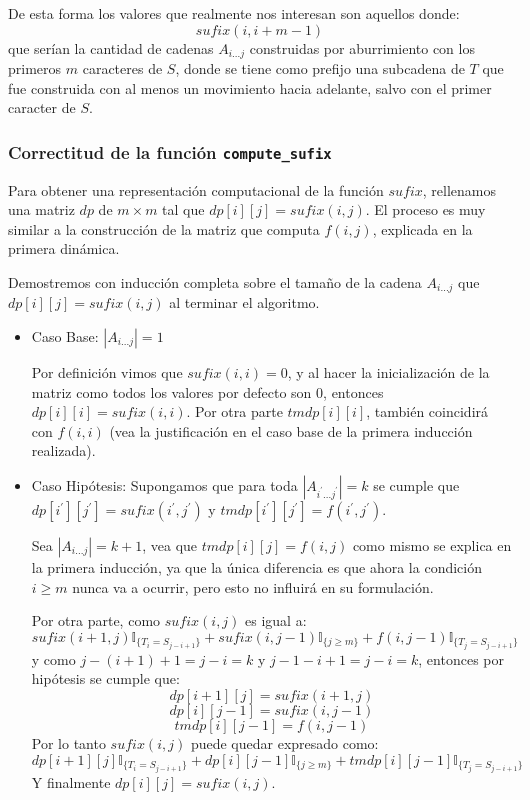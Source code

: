 \documentclass[a4paper]{article}
\begin{document}
    De esta forma los valores que realmente nos interesan son aquellos donde:
    $$sufix(i, i+m-1)$$
    que serían la cantidad de cadenas $A_{i...j}$ construidas por aburrimiento con los primeros $m$ caracteres de $S$, donde se tiene como prefijo una subcadena de $T$ que fue construida con al menos un movimiento hacia adelante, salvo con el primer caracter de $S$.
    

    \subsubsection*{Correctitud de la funci\'on \texttt{compute\_sufix}}

    Para obtener una representaci\'on computacional de la funci\'on $sufix$,
    rellenamos una matriz $dp$ de $m \times m$ tal que $dp[i][j] = sufix(i,j)$. El proceso es muy similar a la construcción de la matriz que computa $f(i,j)$, explicada en la primera dinámica.
    
    Demostremos con inducción completa sobre el tamaño de la cadena $A_{i...j}$ que $dp[i][j]=sufix(i,j)$ al terminar el algoritmo.
    
    \begin{itemize}
    	\item Caso Base: $|A_{i...j}| = 1$
    	
    	Por definición vimos que $sufix(i,i) = 0$, y al hacer la inicialización de la matriz como todos los valores por defecto son $0$, entonces $dp[i][i] = sufix(i,i)$.
    	Por otra parte $tmdp[i][i]$, también coincidirá con $f(i,i)$ (vea la justificación en el caso base de la primera inducción realizada).
    	
    	\item Caso Hipótesis:
    	Supongamos que para toda $|A_{i^\prime...j^\prime}| = k$ se cumple que $dp[i^\prime][j^\prime] = sufix(i^\prime, j^\prime)$ y $tmdp[i^\prime][j^\prime] = f(i^\prime, j^\prime)$.
    	
    	Sea $|A_{i...j}| = k + 1$, vea que $tmdp[i][j] = f(i,j)$ como mismo se explica en la primera inducción, ya que la única diferencia es que ahora la condición $i \ge m$ nunca va a ocurrir, pero esto no influirá en su formulación.
    	
    	Por otra parte, como $sufix(i,j)$ es igual a:
    	$$ sufix(i+1,j)\mathbb{I}_{ \{ T_i = S_{j-i+1} \}} + 
    	sufix(i, j-1) \mathbb{I}_{ \{ j \ge m \}} + 
    	f(i, j-1) \mathbb{I}_{ \{ T_j = S_{j-i+1}\}} $$
    	y como $j-(i+1)+1 = j-i = k$ y $j-1 - i + 1 = j-i=k$, entonces por hipótesis se cumple que:
    	$$ dp[i+1][j] = sufix(i+1,j) $$
    	$$ dp[i][j-1] = sufix(i,j-1) $$
    	$$ tmdp[i][j-1] = f(i,j-1) $$
    	Por lo tanto $sufix(i,j)$ puede quedar expresado como:
    	$$ dp[i+1][j]\mathbb{I}_{ \{ T_i = S_{j-i+1} \}} + 
    	dp[i][j-1] \mathbb{I}_{ \{ j \ge m \}} + 
    	tmdp[i][j-1] \mathbb{I}_{ \{ T_j = S_{j-i+1}\}} $$
    	Y finalmente $dp[i][j] = sufix(i,j)$.    	
    \end{itemize}
	
\end{document}
